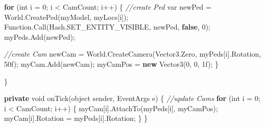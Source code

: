 \documentclass[
  openany]{book}
\newenvironment{Shaded}{\begin{snugshade}}{\end{snugshade}}
\newcommand{\CommentTok}[1]{\textcolor[rgb]{0.56,0.35,0.01}{\textit{#1}}}
\newcommand{\DataTypeTok}[1]{\textcolor[rgb]{0.13,0.29,0.53}{#1}}
\newcommand{\DecValTok}[1]{\textcolor[rgb]{0.00,0.00,0.81}{#1}}
\newcommand{\FunctionTok}[1]{\textcolor[rgb]{0.00,0.00,0.00}{#1}}
\newcommand{\KeywordTok}[1]{\textcolor[rgb]{0.13,0.29,0.53}{\textbf{#1}}}
\newcommand{\NormalTok}[1]{#1}
\begin{document}
\begin{Shaded}
\begin{Highlighting}[]
            \KeywordTok{for}\NormalTok{ (}\DataTypeTok{int}\NormalTok{ i = }\DecValTok{0}\NormalTok{; i < CamCount; i++)}
\NormalTok{            \{}
                \CommentTok{//create Ped}
                \DataTypeTok{var}\NormalTok{ newPed = World.}\FunctionTok{CreatePed}\NormalTok{(myModel, myLocs[i]);}
\NormalTok{        Function.}\FunctionTok{Call}\NormalTok{(Hash.}\FunctionTok{SET_ENTITY_VISIBLE}\NormalTok{, newPed, }\KeywordTok{false}\NormalTok{, }\DecValTok{0}\NormalTok{);}
\NormalTok{                myPeds.}\FunctionTok{Add}\NormalTok{(newPed);}

                \CommentTok{//create Cam}
\NormalTok{                newCam = World.}\FunctionTok{CreateCamera}\NormalTok{(Vector3.}\FunctionTok{Zero}\NormalTok{, myPeds[i].}\FunctionTok{Rotation}\NormalTok{, 50f);}
\NormalTok{                myCam.}\FunctionTok{Add}\NormalTok{(newCam);}
\NormalTok{                myCamPos = }\KeywordTok{new} \FunctionTok{Vector3}\NormalTok{(}\DecValTok{0}\NormalTok{, }\DecValTok{0}\NormalTok{, 1f);}
\NormalTok{            \}}
            
\NormalTok{        \}}

        \KeywordTok{private} \DataTypeTok{void} \FunctionTok{onTick}\NormalTok{(}\DataTypeTok{object}\NormalTok{ sender, EventArgs e)}
\NormalTok{        \{}
            \CommentTok{//update Cams}
            \KeywordTok{for}\NormalTok{ (}\DataTypeTok{int}\NormalTok{ i = }\DecValTok{0}\NormalTok{; i < CamCount; i++)}
\NormalTok{            \{}
\NormalTok{                myCam[i].}\FunctionTok{AttachTo}\NormalTok{(myPeds[i], myCamPos);}
\NormalTok{                myCam[i].}\FunctionTok{Rotation}\NormalTok{ = myPeds[i].}\FunctionTok{Rotation}\NormalTok{;}
\NormalTok{            \}}
\NormalTok{        \}}


\end{Highlighting}
\end{Shaded}
\end{document}
